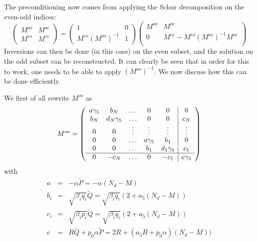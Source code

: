 \documentclass[12pt]{article}
\begin{document}
The preconditioning now comes from applying the Schur decomposition
on the even-odd indices:
\begin{equation}
\left( \begin{array}{cc}
M^{oo} & M^{oe} \\
M^{eo} & M^{ee}
\end{array} \right) = \left( \begin{array}{cc}
                                 1   &   0  \\
                               M^{eo}(M^{oo})^{-1} & 1 
                      \end{array} \right) 
                      \left( \begin{array}{cc}
                               M^{oo} &  M^{oe} \\
                                 0    & M^{ee} - M^{eo}(M^{oo})^{-1}M^{oe} \\
                      \end{array} \right)
\end{equation}
Inversions can then be done (in this case) on the even subset, and the 
solution on the odd subset can be reconstructed. It can clearly be
seen that in order for this to work, one needs to be able to apply
$(M^{oo})^{-1}$. We now discuss how this can be done efficiently.

We first of all rewrite $M^{oo}$ as
\begin{equation}
M^{oo} = \left( \begin{array}{ccccc|c}
a  \gamma_5 & b_N & \ldots & 0 & 0 & 0 \\
b_N     & d_N \gamma_5 & \ldots & 0 & 0 & c_N \\
 0      &  0  & \vdots & \vdots & \vdots& \vdots \\
 0      &  0  & \ldots & a \gamma_5 & b_1  & 0 \\
 0      &  0  & \ldots & b_1    & d_1 \gamma_5 & c_1 \\
\hline
 0      & -c_N & \ldots & 0     & -c_1 &  e \gamma_5 
\end{array}\right) 
\end{equation}
with
\begin{eqnarray}
a   &=& -\alpha \tilde{P} = -\alpha(N_d-M) \\
b_i &=& \sqrt{\beta_i q_i}\tilde{Q} = \sqrt{\beta_i q_i}(2 + a_5(N_d-M)) \\
c_i &=& \sqrt{\beta_i p_i}\tilde{Q} = \sqrt{\beta_i q_i}(2 + a_5(N_d-M)) \\
e &=& R\tilde{Q} + p_0\alpha\tilde{P} = 2R + ( a_5 R + p_0\alpha )(N_d-M))
\end{eqnarray}
\end{document}
